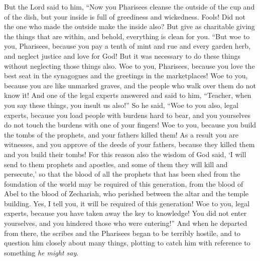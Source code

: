 \begin{biblechapter}
\verse But the Lord said to him, “Now you Pharisees cleanse the outside of the cup and of the dish, but your inside is full of greediness and wickedness.
\verse Fools! Did not the one who made the outside make the inside also?
\verse But give as charitable giving the things that are within, and behold, everything is clean for you.
\verse “But woe to you, Pharisees, because you pay a tenth of mint and rue and every garden herb, and neglect justice and love for God! But it was necessary to do these things without neglecting those things also.
\verse Woe to you, Pharisees, because you love the best seat in the synagogues and the greetings in the marketplaces!
\verse Woe to you, because you are like unmarked graves, and the people who walk over them do not know it!
\verse And one of the legal experts answered and said to him, “Teacher, when you say these things, you insult us also!”
\verse So he said, “Woe to you also, legal experts, because you load people with burdens hard to bear, and you yourselves do not touch the burdens with one of your fingers!
\verse Woe to you, because you build the tombs of the prophets, and your fathers killed them!
\verse As a result you are witnesses, and you approve of the deeds of your fathers, because they killed them and you build their tombs!
\verse For this reason also the wisdom of God said, ‘I will send to them prophets and apostles, and some of them they will kill and persecute,’
\verse so that the blood of all the prophets that has been shed from the foundation of the world may be required of this generation,
\verse from the blood of Abel to the blood of Zechariah, who perished between the altar and the temple building. Yes, I tell you, it will be required of this generation!
\verse Woe to you, legal experts, because you have taken away the key to knowledge! You did not enter yourselves, and you hindered those who were entering!”
\verse And when he departed from there, the scribes and the Pharisees began to be terribly hostile, and to question him closely about many things,
\verse plotting to catch him with reference to something \textit{he might say}.
\end{biblechapter}

